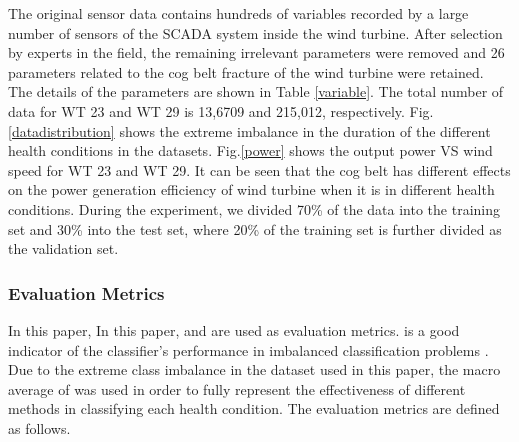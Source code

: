 \documentclass[lettersize,journal]{IEEEtran}
\begin{document}

The original sensor data contains hundreds of variables recorded by a large number of sensors of the SCADA system inside the wind turbine. After selection by experts in the field, the remaining irrelevant parameters were removed and 26 parameters related to the cog belt fracture of the wind turbine were retained. The details of the parameters are shown in Table \ref{variable}. The total number of data for WT 23 and WT 29 is 13,6709 and 215,012, respectively. Fig.\ref{datadistribution} shows the extreme imbalance in the duration of the different health conditions in the datasets. Fig.\ref{power} shows the output power VS wind speed for WT 23 and WT 29. It can be seen that the cog belt has different effects on the power generation efficiency of wind turbine when it is in different health conditions. During the experiment, we divided 70\% of the data into the training set and 30\% into the test set, where 20\%  of the training set is further divided as the validation set.




\subsubsection{Evaluation Metrics}%
In this paper, In this paper,  and  \cite{barandela2003strategies,ri2020g} are used as evaluation metrics.  is a good indicator of the classifier's performance in imbalanced classification problems \cite{kubat1997addressing}. Due to the extreme class imbalance in the dataset used in this paper, the macro average of  was used in order to fully represent the effectiveness of different methods in classifying each health condition. The evaluation metrics are defined as follows.
\end{document}
